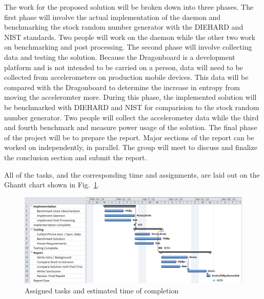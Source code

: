 
The work for the proposed solution will be broken down into three phases.  The
first phase will involve the actual implementation of the daemon and
benchmarking the stock random number generator with the DIEHARD and NIST
standards.  Two people will work on the daemon while the other two work on
benchmarking and post processing.  The second phase will involve collecting data
and testing the solution.  Because the Dragonboard is a development platform and
is not intended to be carried on a person, data will need to be collected from
accelerometers on production mobile devices.  This data will be compared with
the Dragonboard to determine the increase in entropy from moving the
acceleromter more.  During this phase, the implemented solution will be
benchmarked with DIEHARD and NIST for comparision to the stock random number
generator.  Two people will collect the accelerometer data while the third and
fourth benchmark and measure power usage of the solution.  The final phase of
the project will be to prepare the report.  Major sections of the report can be
worked on independently, in parallel.  The group will meet to discuss and
finalize the conclusion section and submit the report.  

All of the tasks, and the corresponding time and assignments, are laid out on
the Ghantt chart shown in Fig.~\ref{fig:gahntt}.

\begin{figure}[t]
    \centering
    \includegraphics[scale=0.71]{proj-ghantt-v3}
    \caption{Assigned tasks and estimated time of completion}
    \label{fig:gahntt}
\end{figure}
